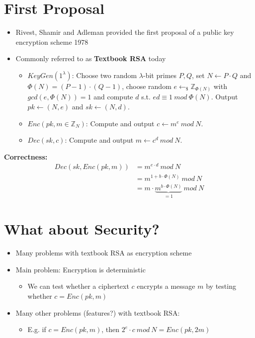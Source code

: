 \section{First Proposal}
	\begin{itemize}
		\item Rivest, Shamir and Adleman provided the first proposal of a public key encryption scheme 1978
		\item Commonly referred to as \textbf{Textbook RSA} today
		\begin{itemize}
			\item $KeyGen(1^{\lambda})$: Choose two random $\lambda$-bit primes $P,Q$, set $N \leftarrow P \cdot Q$ and $\Phi(N) = (P-1) \cdot (Q-1)$, 
			choose random $e \leftarrow_{\$} \mathbb{Z}_{\Phi(N)}$ with $gcd(e,\Phi(N)) = 1$ and compute $d$ s.t. $ ed \equiv 1 \ mod\ \Phi(N)$. 
			Output $pk \leftarrow (N,e)$ and $sk \leftarrow (N,d)$.
			\item $Enc(pk,m \in \mathbb{Z}_N)$: Compute and output $c \leftarrow m^e \ mod\ N$.
			\item $Dec(sk,c)$: Compute and output $m \leftarrow c^d \ mod\ N$.
		\end{itemize}
	\end{itemize}
	\textbf{Correctness:} 
	\begin{align*}
		Dec(sk,Enc(pk,m)) &= m^{e \cdot d} \ mod\ N\\
		&= m^{1 + b \cdot \Phi(N)} \ mod\ N\\
		&= m \cdot \underbrace{m^{b \cdot \Phi(N)}}_{=1} \ mod\ N
	\end{align*}

\section{What about Security?}
	\begin{itemize}
		\item Many problems with textbook RSA as encryption scheme
		\item Main problem: Encryption is deterministic
		\begin{itemize}
			\item We can test whether a ciphertext $c$ encrypts a message $m$ by testing whether $c = Enc(pk,m)$
		\end{itemize}
		\item Many other problems (features?) with textbook RSA:
		\begin{itemize}
			\item E.g. if $c = Enc(pk,m)$, then $2^e \cdot c \ mod \ N = Enc(pk,2m)$
		\end{itemize}
	\end{itemize}

